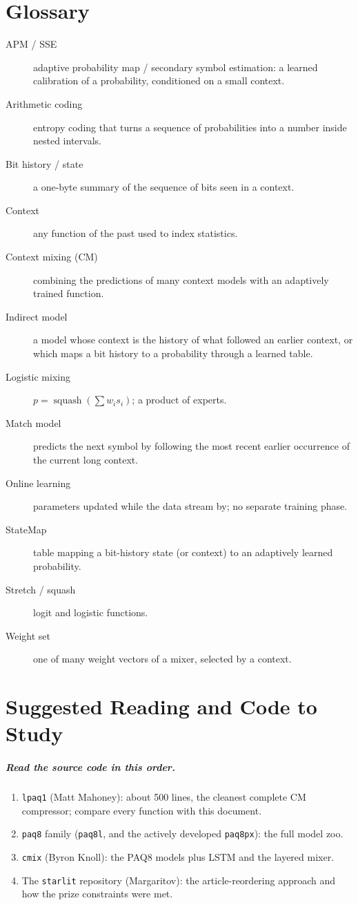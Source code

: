 \documentclass[11pt,a4paper,openany]{book}
\newcommand{\sq}{\operatorname{squash}}
\newcommand{\code}[1]{\texttt{#1}}
\theoremstyle{definition}
\theoremstyle{remark}
\begin{document}
\chapter{Glossary}

\begin{description}
\item[APM / SSE] adaptive probability map / secondary symbol estimation: a learned calibration of a probability, conditioned on a small context.
\item[Arithmetic coding] entropy coding that turns a sequence of probabilities into a number inside nested intervals.
\item[Bit history / state] a one-byte summary of the sequence of bits seen in a context.
\item[Context] any function of the past used to index statistics.
\item[Context mixing (CM)] combining the predictions of many context models with an adaptively trained function.
\item[Indirect model] a model whose context is the history of what followed an earlier context, or which maps a bit history to a probability through a learned table.
\item[Logistic mixing] $p=\sq(\sum w_is_i)$; a product of experts.
\item[Match model] predicts the next symbol by following the most recent earlier occurrence of the current long context.
\item[Online learning] parameters updated while the data stream by; no separate training phase.
\item[StateMap] table mapping a bit-history state (or context) to an adaptively learned probability.
\item[Stretch / squash] logit and logistic functions.
\item[Weight set] one of many weight vectors of a mixer, selected by a context.
\end{description}

\chapter{Suggested Reading and Code to Study}

\paragraph{Read the source code in this order.}
\begin{enumerate}
\item \code{lpaq1} (Matt Mahoney): about 500 lines, the cleanest complete CM compressor; compare every function with this document.
\item \code{paq8} family (\code{paq8l}, and the actively developed \code{paq8px}): the full model zoo.
\item \code{cmix} (Byron Knoll): the PAQ8 models plus LSTM and the layered mixer.
\item The \code{starlit} repository (Margaritov): the article-reordering approach and how the prize constraints were met.
\end{enumerate}
\end{document}
